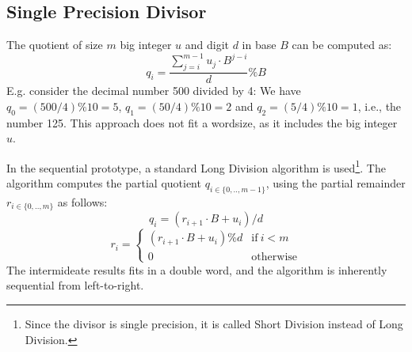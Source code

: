 \subsection{Single Precision Divisor}
\pagebreak



The quotient of size $m$ big integer $u$ and digit $d$ in base $B$ can be
computed as:
\begin{equation}
  \label{eq:1}
  q_i = \dfrac{\sum_{j=i}^{m-1} u_j \cdot B^{j-i}}{d}\% B
\end{equation}
E.g. consider the decimal number 500 divided by 4: We have
$q_0 = (500 / 4) \% 10 = 5$, $q_1 = (50 / 4) \% 10 = 2$ and
$q_2 = (5 / 4) \% 10 = 1$, i.e., the number 125. This approach does not fit a
wordsize, as it includes the big integer $u$.

In the sequential prototype, a standard Long Division algorithm is
used\footnote{Since the divisor is single precision, it is called Short Division
  instead of Long Division.}. The algorithm computes the partial quotient
$q_{i\in\{0,..,m-1\}}$, using the partial remainder $r_{i\in\{0,..,m\}}$ as follows:
\begin{equation}
  \label{eq:1}
  q_i = \left( r_{i+1} \cdot B + u_i\right) / d
\end{equation}
\begin{equation}
  \label{eq:1}
  r_i = \begin{cases} \left( r_{i+1} \cdot B + u_i\right) \% d & \text{if}~i<m \\ 0 & \text{otherwise} \end{cases}
\end{equation}
The intermideate results fits in a double word, and the algorithm is inherently
sequential from left-to-right.


